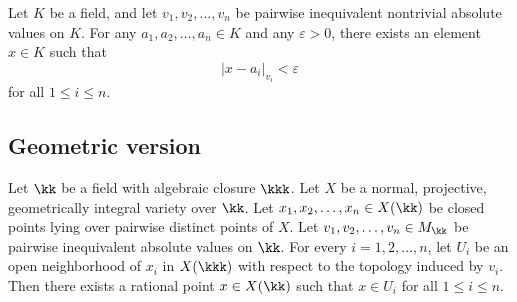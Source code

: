
    \begin{theorem}
        Let \(K\) be a field, and let \(v_1, v_2, \ldots, v_n\) be pairwise inequivalent nontrivial absolute values on \(K\). For any \(a_1, a_2, \ldots, a_n \in K\) and any \(\varepsilon > 0\), there exists an element \(x \in K\) such that
        \[
            |x - a_i|_{v_i} < \varepsilon
        \]
        for all \(1 \leq i \leq n\).
    \end{theorem}


\subsection{Geometric version}

    \begin{theorem}\label{thm:Artin_whaples_approximation_on_varieties}
        Let \(\kk\) be a field with algebraic closure \(\kkk\).
        Let \(X\) be a normal, projective, geometrically integral variety over \(\kk\).
        Let \(x_1, x_2, \ldots, x_n \in X(\kk)\) be closed points lying over pairwise distinct points of \(X\).
        Let \(v_1, v_2, \ldots, v_n \in M_\kk\) be pairwise inequivalent absolute values on \(\kk\).
        For every \(i = 1, 2, \ldots, n\), let \(U_i\) be an open neighborhood of \(x_i\) in \(X(\kkk)\) with respect to the topology induced by \(v_i\).
        Then there exists a rational point \(x \in X(\kk)\) such that \(x \in U_i\) for all \(1 \leq i \leq n\).
    \end{theorem}

